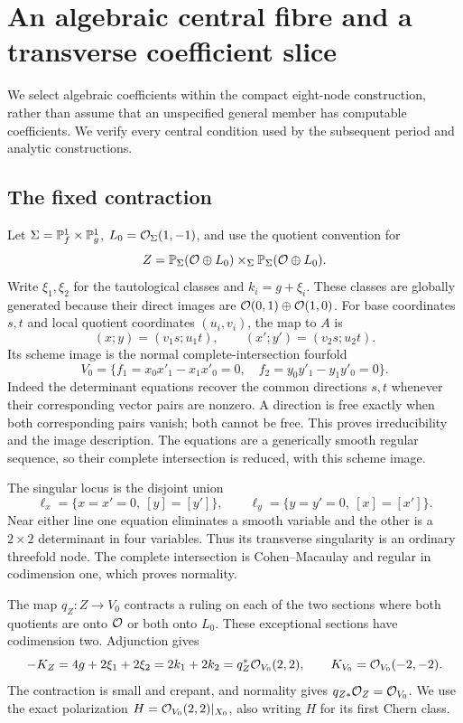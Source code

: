 \section{An algebraic central fibre and a transverse coefficient slice}
\label{sec:algebraic-family}

We select algebraic coefficients within the compact eight-node
construction, rather than assume that an unspecified general member
has computable coefficients. We verify every central condition used
by the subsequent period and analytic constructions.

\subsection{The fixed contraction}

Let $\Sigma=\mathbb P^1_f\times\mathbb P^1_g$, $L_0=\mathcal O_\Sigma(1,-1)$,
and use the quotient convention for
\[
 Z=\mathbb P_\Sigma(\mathcal O\oplus L_0)
       \times_\Sigma\mathbb P_\Sigma(\mathcal O\oplus L_0).
\]
Write $\xi_1,\xi_2$ for the tautological classes and $k_i=g+\xi_i$.
These classes are globally generated because their direct images are
$\mathcal O(0,1)\oplus\mathcal O(1,0)$. For base coordinates $s,t$ and local
quotient coordinates $(u_i,v_i)$, the map to $A$ is
\begin{equation}\label{eq:fixed-contraction}
 (x;y)=(v_1s;u_1t),\qquad (x';y')=(v_2s;u_2t).
\end{equation}
Its scheme image is the normal complete-intersection fourfold
\begin{equation}\label{eq:fixed-fourfold}
 V_0=\{f_1=x_0x'_1-x_1x'_0=0,\quad
                 f_2=y_0y'_1-y_1y'_0=0\}.
\end{equation}
Indeed the determinant equations recover the common directions
$s,t$ whenever their corresponding vector pairs are nonzero. A
direction is free exactly when both corresponding pairs vanish;
both cannot be free. This proves irreducibility and the image
description. The equations are a generically smooth regular sequence,
so their complete intersection is reduced, with this scheme image.

The singular locus is the disjoint union
\[
 \ell_x=\{x=x'=0,\ [y]=[y']\},\qquad
 \ell_y=\{y=y'=0,\ [x]=[x']\}.
\]
Near either line one equation eliminates a smooth variable and the
other is a $2\times2$ determinant in four variables. Thus its
transverse singularity is an ordinary threefold node. The complete
intersection is Cohen--Macaulay and regular in codimension one,
which proves normality.

The map $q_Z:Z\to V_0$ contracts a ruling on each of the two
sections where both quotients are onto $\mathcal O$ or both onto $L_0$.
These exceptional sections have codimension two. Adjunction gives
\begin{equation}\label{eq:central-anticanonical}
 -K_Z=4g+2\xi_1+2\xi_2=2k_1+2k_2
             =q_Z^*\mathcal O_{V_0}(2,2),\qquad
 K_{V_0}=\mathcal O_{V_0}(-2,-2).
\end{equation}
The contraction is small and crepant, and normality gives
$q_{Z*}\mathcal O_Z=\mathcal O_{V_0}$. We use the exact polarization
$H=\mathcal O_{V_0}(2,2)|_{X_0}$, also writing $H$ for its first Chern class.


